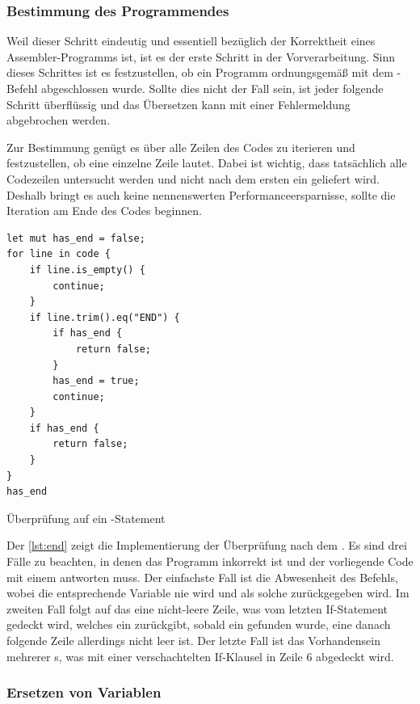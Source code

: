 \subsubsection{Bestimmung des Programmendes}

Weil dieser Schritt eindeutig und essentiell bezüglich der Korrektheit eines Assembler-Programms ist, ist es der erste Schritt in der Vorverarbeitung. Sinn dieses Schrittes ist es festzustellen, ob ein Programm ordnungsgemäß mit dem -Befehl abgeschlossen wurde. Sollte dies nicht der Fall sein, ist jeder folgende Schritt überflüssig und das Übersetzen kann mit einer Fehlermeldung abgebrochen werden.

Zur Bestimmung genügt es über alle Zeilen des Codes zu iterieren und festzustellen, ob eine einzelne Zeile  lautet. Dabei ist wichtig, dass tatsächlich alle Codezeilen untersucht werden und nicht nach dem ersten  ein  geliefert wird. Deshalb bringt es auch keine nennenswerten Performanceersparnisse, sollte die Iteration am Ende des Codes beginnen. 

\begin{listing}[th]
\begin{verbatim}
let mut has_end = false;
for line in code {
    if line.is_empty() {
        continue;
    }
    if line.trim().eq("END") {
        if has_end {
            return false;
        }
        has_end = true;
        continue;
    }
    if has_end {
        return false;
    }
}
has_end
\end{verbatim}
\label{lst:end}
\caption{Überprüfung auf ein -Statement}
\end{listing}

Der \cref{lst:end} zeigt die Implementierung der Überprüfung nach dem . Es sind drei Fälle zu beachten, in denen das Programm inkorrekt ist und der vorliegende Code mit einem  antworten muss. Der einfachste Fall ist die Abwesenheit des Befehls, wobei die entsprechende Variable nie  wird und als solche zurückgegeben wird. Im zweiten Fall folgt auf das  eine nicht-leere Zeile, was vom letzten If-Statement gedeckt wird, welches ein  zurückgibt, sobald ein  gefunden wurde, eine danach folgende Zeile allerdings nicht leer ist. Der letzte Fall ist das Vorhandensein mehrerer s, was mit einer verschachtelten If-Klausel in Zeile 6 abgedeckt wird.

\subsubsection{Ersetzen von Variablen}\label{chap:var-replacement}

